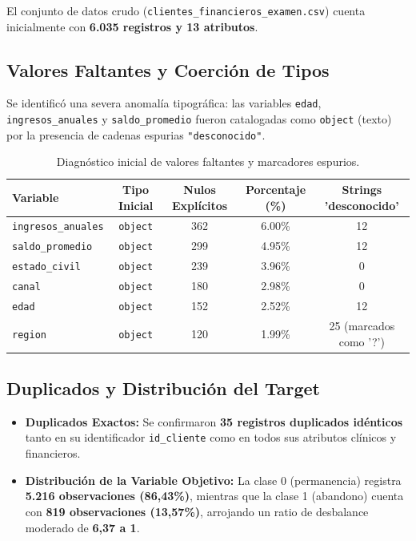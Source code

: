 \documentclass[12pt,a4paper]{article}
\begin{document}
El conjunto de datos crudo (\texttt{clientes\_financieros\_examen.csv}) cuenta inicialmente con \textbf{6.035 registros y 13 atributos}.

\subsection{Valores Faltantes y Coerción de Tipos}
Se identificó una severa anomalía tipográfica: las variables \texttt{edad}, \texttt{ingresos\_anuales} y \texttt{saldo\_promedio} fueron catalogadas como \texttt{object} (texto) por la presencia de cadenas espurias \texttt{"desconocido"}.

\begin{table}[H]
\centering
\small
\begin{tabular}{@{}lcccc@{}}
\toprule
\textbf{Variable} & \textbf{Tipo Inicial} & \textbf{Nulos Explícitos} & \textbf{Porcentaje (\%)} & \textbf{Strings 'desconocido'} \\
\midrule
\texttt{ingresos\_anuales} & \texttt{object} & 362 & 6.00\% & 12 \\
\texttt{saldo\_promedio}   & \texttt{object} & 299 & 4.95\% & 12 \\
\texttt{estado\_civil}     & \texttt{object} & 239 & 3.96\% & 0 \\
\texttt{canal}            & \texttt{object} & 180 & 2.98\% & 0 \\
\texttt{edad}             & \texttt{object} & 152 & 2.52\% & 12 \\
\texttt{region}           & \texttt{object} & 120 & 1.99\% & 25 (marcados como '?') \\
\bottomrule
\end{tabular}
\caption{Diagnóstico inicial de valores faltantes y marcadores espurios.}
\end{table}

\subsection{Duplicados y Distribución del Target}
\begin{itemize}[noitemsep]
    \item \textbf{Duplicados Exactos:} Se confirmaron \textbf{35 registros duplicados idénticos} tanto en su identificador \texttt{id\_cliente} como en todos sus atributos clínicos y financieros.
    \item \textbf{Distribución de la Variable Objetivo:} La clase 0 (permanencia) registra \textbf{5.216 observaciones (86,43\%)}, mientras que la clase 1 (abandono) cuenta con \textbf{819 observaciones (13,57\%)}, arrojando un ratio de desbalance moderado de \textbf{6,37 a 1}.
\end{itemize}
\end{document}
